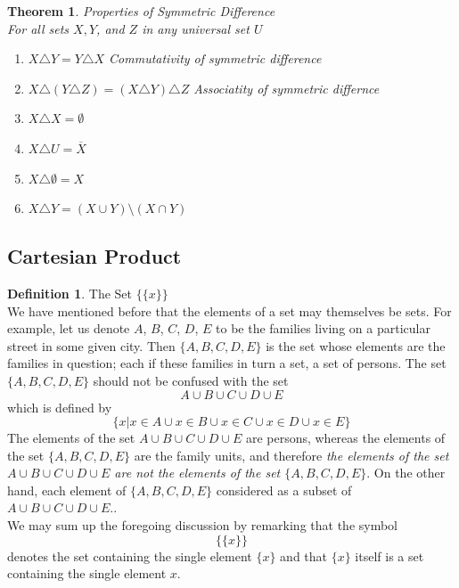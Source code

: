 \documentclass{book}
\newtheorem{theorem}{Theorem}[section]
\theoremstyle{definition}
\newtheorem{definition}{Definition}[section]
\theoremstyle{remark}
\begin{document}
\begin{theorem}
Properties of Symmetric Difference \\

For all sets $X, Y$, and $Z$ in any universal set $U$ \\

    \begin{enumerate}
        \item $X \triangle Y = Y \triangle X$ \textit{Commutativity of symmetric difference}
        \item $X \triangle (Y \triangle Z) = (X \triangle Y) \triangle Z$ \textit{Associatity of symmetric differnce}
        \item $X \triangle X = \emptyset$
        \item $X \triangle U = \overline{X}$
        \item $X \triangle \emptyset = X$
        \item $X \triangle Y = (X \cup Y) \setminus (X \cap Y)$
    \end{enumerate}
\end{theorem}


\newpage
\subsection{Cartesian Product}

\begin{definition}
The Set $\{ \{ x \}  \}$ \\

We have mentioned before that the elements of a set may themselves be sets. For example, let us denote $A$, $B$, $C$, $D$, $E$ to be the families living on a particular street in some  given city. Then $\{ A, B, C, D, E \}$ is the set whose elements are the families in question; each if these families in turn a set, a set of persons. The set $\{ A, B, C, D, E \}$ should not be confused with the set 
    \begin{equation*}
        A \cup B \cup C \cup D \cup E
    \end{equation*}
which is defined by 
    \begin{equation*}
        \{ x | x \in A \cup x \in B \cup x \in C \cup x \in D \cup x \in E \}
    \end{equation*}
The elements of the set $A \cup B \cup C \cup D \cup E$ are persons, whereas the elements of the set $\{ A, B, C, D, E \}$ are the family units, and therefore  \textit{the elements of the set $A \cup B \cup C \cup D \cup E$ are not the elements of the set $\{ A, B, C, D, E \}$}. On the other hand, each element of $\{ A, B, C, D, E \}$ considered as a subset of $A \cup B \cup C \cup D \cup E$.. \\

We may sum up the foregoing discussion by remarking that the symbol 
    \begin{equation*}
        \{ \{ x \} \}
    \end{equation*}
denotes the set containing the single element $\{x\}$ and  that $\{x\}$ itself is a set containing the single element $x$. 
\end{definition}
\end{document}

